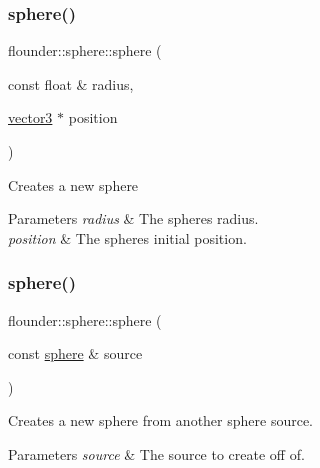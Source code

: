 \subsubsection{\texorpdfstring{sphere()}{sphere()}\hspace{0.1cm}{\footnotesize\ttfamily [3/4]}}
{\footnotesize\ttfamily flounder\+::sphere\+::sphere (\begin{DoxyParamCaption}\item[{const float \&}]{radius,  }\item[{\hyperlink{classflounder_1_1vector3}{vector3} $\ast$}]{position }\end{DoxyParamCaption})}



Creates a new sphere 


\begin{DoxyParams}{Parameters}
{\em radius} & The spheres radius. \\
\hline
{\em position} & The spheres initial position. \\
\hline
\end{DoxyParams}
\mbox{\label{classflounder_1_1sphere_aa1ae44ea868f8884908eec5f6250032e}} 
\subsubsection{\texorpdfstring{sphere()}{sphere()}\hspace{0.1cm}{\footnotesize\ttfamily [4/4]}}
{\footnotesize\ttfamily flounder\+::sphere\+::sphere (\begin{DoxyParamCaption}\item[{const \hyperlink{classflounder_1_1sphere}{sphere} \&}]{source }\end{DoxyParamCaption})}



Creates a new sphere from another sphere source. 


\begin{DoxyParams}{Parameters}
{\em source} & The source to create off of. \\
\hline
\end{DoxyParams}
\mbox{\label{classflounder_1_1sphere_ab6f5bcdd6c9f36e582aab2e267b1abcf}} 
